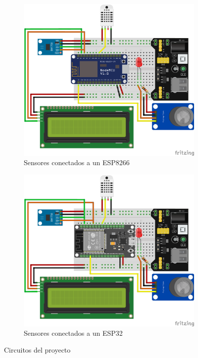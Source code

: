 \begin{figure}[H]
    \centering
    \begin{subfigure}[b]{0.45\linewidth}
        \includegraphics[width=\linewidth]{img/proyecto_esp8266.png}
        \caption{Sensores conectados a un ESP8266}
        \label{fig:esp8266}
    \end{subfigure}
    \begin{subfigure}[b]{0.45\linewidth}
        \includegraphics[width=\linewidth]{img/proyecto_esp32.png}
        \caption{Sensores conectados a un ESP32}
        \label{fig:esp32}
    \end{subfigure}
    \caption{Circuitos del proyecto}
    \label{fig:proyectos}
\end{figure}

